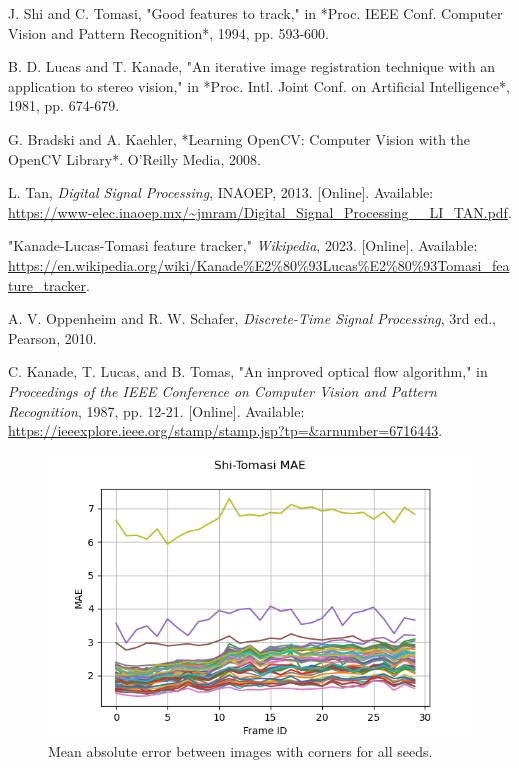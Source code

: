\documentclass[11pt, conference, letterpaper]{IEEEtran}
\begin{document}
\begin{thebibliography}{1}

    J. Shi and C. Tomasi, "Good features to track," in *Proc. IEEE Conf. Computer Vision and Pattern Recognition*, 1994, pp. 593-600.
    
    B. D. Lucas and T. Kanade, "An iterative image registration technique with an application to stereo vision," in *Proc. Intl. Joint Conf. on Artificial Intelligence*, 1981, pp. 674-679.
    
    G. Bradski and A. Kaehler, *Learning OpenCV: Computer Vision with the OpenCV Library*. O'Reilly Media, 2008.
    
    L. Tan, \textit{Digital Signal Processing}, INAOEP, 2013. [Online]. Available: \url{https://www-elec.inaoep.mx/~jmram/Digital_Signal_Processing__LI_TAN.pdf}.
    
    "Kanade-Lucas-Tomasi feature tracker," \textit{Wikipedia}, 2023. [Online]. Available: \url{https://en.wikipedia.org/wiki/Kanade%E2%80%93Lucas%E2%80%93Tomasi_feature_tracker}.
    
    A. V. Oppenheim and R. W. Schafer, \textit{Discrete-Time Signal Processing}, 3rd ed., Pearson, 2010.
    
    C. Kanade, T. Lucas, and B. Tomas, "An improved optical flow algorithm," in \textit{Proceedings of the IEEE Conference on Computer Vision and Pattern Recognition}, 1987, pp. 12-21. [Online]. Available: \url{https://ieeexplore.ieee.org/stamp/stamp.jsp?tp=&arnumber=6716443}.
    
\end{thebibliography}



\begin{figure}[h!]
    \centering
    \includegraphics[width=\linewidth]{mc_images/mc_stc_mae.png}
    \caption{Mean absolute error between images with corners for all seeds.}
    \label{fig:mc_stc_mae}
\end{figure}
\end{document}
